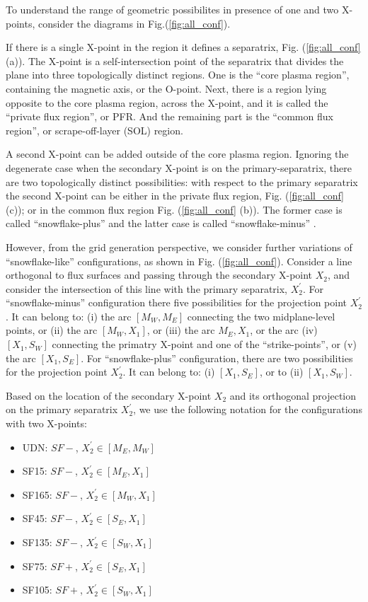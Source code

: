 To understand the range of geometric possibilites in presence of one
and two X-points, consider the diagrams in Fig.(\ref{fig:all_conf}).

If there is a single X-point in the region it defines a separatrix,
Fig. (\ref{fig:all_conf} (a)). The X-point is a self-intersection
point of the separatrix that divides the plane into three
topologically distinct regions. One is the ``core plasma region'',
containing the magnetic axis, or the O-point. Next, there is a region
lying opposite to the core plasma region, across the X-point, and it
is called the ``private flux region'', or PFR. And the remaining part
is the ``common flux region'', or scrape-off-layer (SOL) region.

A second X-point can be added outside of the core plasma region. Ignoring the degenerate case when the secondary X-point is on the primary-separatrix, there are two topologically
distinct possibilities: with respect to the primary separatrix the
second X-point can be either in the private flux region,
Fig. (\ref{fig:all_conf} (c)); or in the common flux region
Fig. (\ref{fig:all_conf} (b)). The former case is called
``snowflake-plus'' and the latter case is called ``snowflake-minus''
\cite{Ryutov2007}.

However, from the grid generation perspective, we consider further
variations of ``snowflake-like'' configurations, as shown in
Fig. (\ref{fig:all_conf}). Consider a line orthogonal to flux surfaces
and passing through the secondary X-point $X_2$, and consider the
intersection of this line with the primary separatrix,
$X^{\prime}_2$. For ``snowflake-minus'' configuration there five
possibilities for the projection point $X^{\prime}_2$. It can belong
to: (i) the arc $[M_W,M_E]$ connecting the two midplane-level points,
or (ii) the arc $[M_W,X_1]$, or (iii) the arc $M_E,X_1$, or the arc
(iv) $[X_1,S_W]$ connecting the primatry X-point and one of the
``strike-points'', or (v) the arc $[X_1,S_E]$. For ``snowflake-plus''
configuration, there are two possibilities for the projection point
$X^{\prime}_2$. It can belong to: (i) $[X_1,S_E]$, or to (ii)
$[X_1,S_W]$.

Based on the location of the secondary X-point $X_2$ and its
orthogonal projection on the primary separatrix $X_2^{\prime}$, we use
the following notation for the configurations with two X-points:

\begin{itemize}
	\item UDN: $SF-$, $X^{\prime}_2 \in [M_E,M_W]$
	\item SF15: $SF-$, $X^{\prime}_2 \in [M_E,X_1]$
	\item SF165: $SF-$, $X^{\prime}_2 \in [M_W,X_1]$
        \item SF45: $SF-$, $X^{\prime}_2 \in [S_E,X_1]$
        \item SF135: $SF-$, $X^{\prime}_2 \in [S_W,X_1]$
        \item SF75: $SF+$, $X^{\prime}_2 \in [S_E,X_1]$
        \item SF105: $SF+$, $X^{\prime}_2 \in [S_W,X_1]$
\end{itemize}

